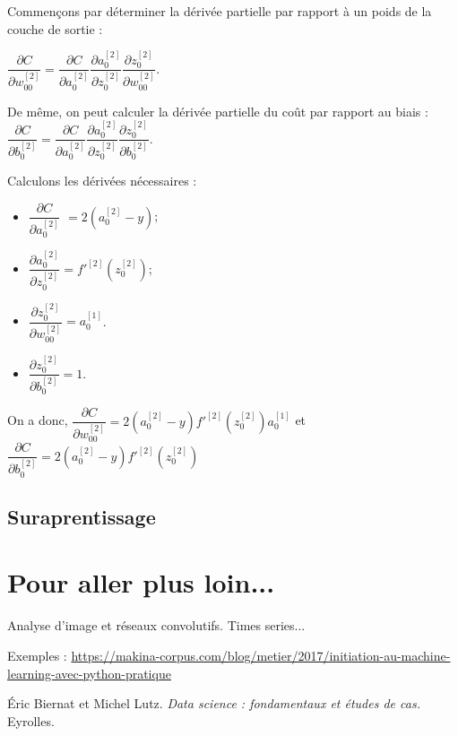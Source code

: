 Commençons par déterminer la dérivée partielle par rapport à un poids de la couche de sortie : 

$\dfrac{\partial C}{\partial w^{[2]}_{00}}=\dfrac{\partial C}{\partial a^{[2]}_{0}}\dfrac{\partial  a^{[2]}_{0}}{\partial z^{[2]}_{0}}\dfrac{\partial z^{[2]}_{0}}{\partial w^{[2]}_{00}}$.

De même, on peut calculer la dérivée partielle du coût par rapport au biais : 
$\dfrac{\partial C}{\partial b^{[2]}_{0}}=\dfrac{\partial C}{\partial a^{[2]}_{0}}\dfrac{\partial  a^{[2]}_{0}}{\partial z^{[2]}_{0}}\dfrac{\partial z^{[2]}_{0}}{\partial b^{[2]}_{0}}$.

Calculons les dérivées nécessaires : 
\begin{multicols}{4}
\begin{itemize}
\item $\dfrac{\partial C}{\partial a^{[2]}_{0}}$ $= 2\left( a^{[2]}_{0} - y  \right)$;
\item $ \dfrac{\partial  a^{[2]}_{0}}{\partial z^{[2]}_{0}} = f'^{[2]}\left(z_0^{[2]}\right)$;
\item $\dfrac{\partial z^{[2]}_{0}}{\partial w^{[2]}_{00}}  = a_0^{[1]} $.
\item $\dfrac{\partial z^{[2]}_{0}}{\partial b^{[2]}_{0}} = 1$.
\end{itemize}
\end{multicols}

On a donc, 
$\dfrac{\partial C}{\partial w^{[2]}_{00}} = 2\left( a^{[2]}_{0} - y  \right)  f'^{[2]}\left(z_0^{[2]}\right) a_0^{[1]}$
et 
$\dfrac{\partial C}{\partial b^{[2]}_{0}} = 2\left( a^{[2]}_{0} - y  \right)  f'^{[2]}\left(z_0^{[2]}\right) $
\begin{defi}
\end{defi}


\subsection{Suraprentissage}

\section{Pour aller plus loin...}

Analyse d'image et réseaux convolutifs. 
Times series...

Exemples : 
\url{https://makina-corpus.com/blog/metier/2017/initiation-au-machine-learning-avec-python-pratique}

\begin{thebibliography}{2}
    Éric Biernat et Michel Lutz. {\it Data science : fondamentaux et études de cas.} Eyrolles.
\end{thebibliography}

